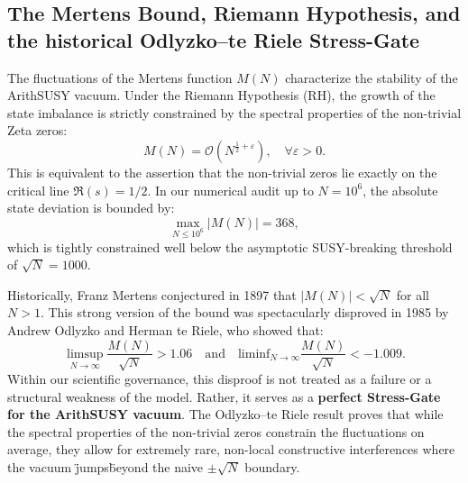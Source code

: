 \documentclass[11pt,a4paper]{article}
\theoremstyle{definition}
\begin{document}
	\subsection{The Mertens Bound, Riemann Hypothesis, and the historical Odlyzko--te Riele Stress-Gate}
	The fluctuations of the Mertens function $M(N)$ characterize the stability of the ArithSUSY vacuum. Under the Riemann Hypothesis (RH), the growth of the state imbalance is strictly constrained by the spectral properties of the non-trivial Zeta zeros:
	\begin{equation}
		M(N) = \mathcal{O}\left(N^{\frac{1}{2} + \varepsilon}\right), \quad \forall \varepsilon > 0.
	\end{equation}
	This is equivalent to the assertion that the non-trivial zeros lie exactly on the critical line $\Re(s) = 1/2$. In our numerical audit up to $N = 10^6$, the absolute state deviation is bounded by:
	\begin{equation}
		\max_{N \le 10^6} |M(N)| = 368,
	\end{equation}
	which is tightly constrained well below the asymptotic SUSY-breaking threshold of $\sqrt{N} = 1000$.
	
	Historically, Franz Mertens conjectured in 1897 that $|M(N)| < \sqrt{N}$ for all $N > 1$. This strong version of the bound was spectacularly disproved in 1985 by Andrew Odlyzko and Herman te Riele, who showed that:
	\begin{equation}
		\limsup_{N \to \infty} \frac{M(N)}{\sqrt{N}} > 1.06 \quad \text{and} \quad \text{liminf}_{N \to \infty} \frac{M(N)}{\sqrt{N}} < -1.009.
	\end{equation}
	Within our scientific governance, this disproof is not treated as a failure or a structural weakness of the model. Rather, it serves as a \textbf{perfect Stress-Gate for the ArithSUSY vacuum}. The Odlyzko--te Riele result proves that while the spectral properties of the non-trivial zeros constrain the fluctuations on average, they allow for extremely rare, non-local constructive interferences where the vacuum \"jumps\" beyond the naive $\pm \sqrt{N}$ boundary.
	
\end{document}
